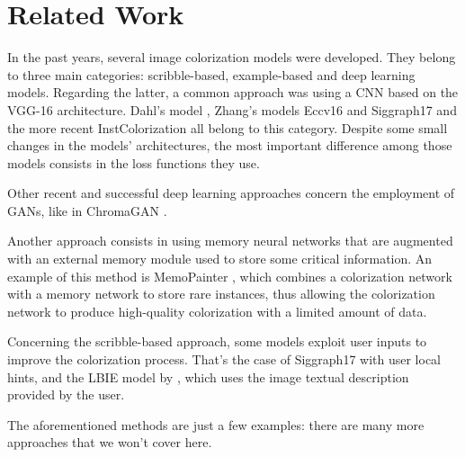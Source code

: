 \section{Related Work}
In the past years, several image colorization models were developed. They belong to three main categories:
scribble-based, example-based and deep learning models. Regarding the latter, a common approach was using
a CNN based on the VGG-16 architecture. Dahl's model \cite{dahl}, Zhang's models Eccv16 \cite{zhang} and Siggraph17
\cite{siggraph} and the more recent InstColorization \cite{su} all belong to this category. Despite some
small changes in the models' architectures, the most important difference among those models consists in the loss
functions they use.

Other recent and successful deep learning approaches concern the employment of GANs, like in
ChromaGAN \cite{chromagan}.
 
Another approach consists in using memory neural networks that are augmented with an external
memory module used to store some critical information. An example of this method is MemoPainter \cite{animation},
which combines a colorization network with a memory network to store rare instances, thus allowing the
colorization network to produce high-quality colorization with a limited amount of data.

Concerning the scribble-based approach, some models exploit user inputs to improve the colorization process.
That's the case of Siggraph17 \cite{siggraph} with user local hints, and the LBIE model by \cite{language}, which
uses the image textual description provided by the user.

The aforementioned methods are just a few examples: there are many more approaches that we won't cover here.
